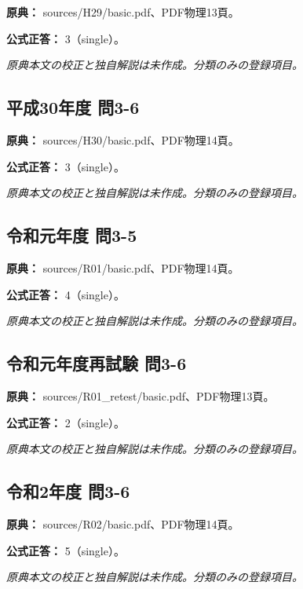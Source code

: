 \noindent\textbf{原典：} sources/H29/basic.pdf、PDF物理13頁。

\textbf{公式正答：} 3（single）。

\par\textit{原典本文の校正と独自解説は未作成。分類のみの登録項目。}

\subsection{平成30年度 問3-6}
\label{q:h30-reg-basic-3-6}

\noindent\textbf{原典：} sources/H30/basic.pdf、PDF物理14頁。

\textbf{公式正答：} 3（single）。

\par\textit{原典本文の校正と独自解説は未作成。分類のみの登録項目。}

\subsection{令和元年度 問3-5}
\label{q:r01-reg-basic-3-5}

\noindent\textbf{原典：} sources/R01/basic.pdf、PDF物理14頁。

\textbf{公式正答：} 4（single）。

\par\textit{原典本文の校正と独自解説は未作成。分類のみの登録項目。}

\subsection{令和元年度再試験 問3-6}
\label{q:r01-ret-basic-3-6}

\noindent\textbf{原典：} sources/R01\_retest/basic.pdf、PDF物理13頁。

\textbf{公式正答：} 2（single）。

\par\textit{原典本文の校正と独自解説は未作成。分類のみの登録項目。}

\subsection{令和2年度 問3-6}
\label{q:r02-reg-basic-3-6}

\noindent\textbf{原典：} sources/R02/basic.pdf、PDF物理14頁。

\textbf{公式正答：} 5（single）。

\par\textit{原典本文の校正と独自解説は未作成。分類のみの登録項目。}

